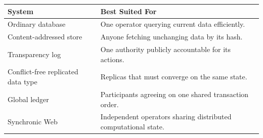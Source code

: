 \begin{tabularx}{\textwidth}{@{}lX@{}}
\toprule
\textbf{System} & \textbf{Best Suited For} \\
\midrule
Ordinary database & One operator querying current data efficiently. \\
Content-addressed store & Anyone fetching unchanging data by its hash. \\
Transparency log & One authority publicly accountable for its actions. \\
Conflict-free replicated data type & Replicas that must converge on the same state. \\
Global ledger & Participants agreeing on one shared transaction order. \\
Synchronic Web & Independent operators sharing distributed computational state. \\
\bottomrule
\end{tabularx}
